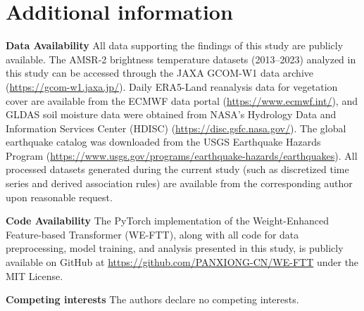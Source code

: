 \documentclass[fleqn,10pt]{wlscirep_mdpi_style}
\begin{document}
\section*{Additional information}
\textbf{Data Availability} 
All data supporting the findings of this study are publicly available. The AMSR-2 brightness temperature datasets (2013–2023) analyzed in this study can be accessed through the JAXA GCOM-W1 data archive (\url{https://gcom-w1.jaxa.jp/}). Daily ERA5-Land reanalysis data for vegetation cover are available from the ECMWF data portal (\url{https://www.ecmwf.int/}), and GLDAS soil moisture data were obtained from NASA's Hydrology Data and Information Services Center (HDISC) (\url{https://disc.gsfc.nasa.gov/}). The global earthquake catalog was downloaded from the USGS Earthquake Hazards Program (\url{https://www.usgs.gov/programs/earthquake-hazards/earthquakes}). All processed datasets generated during the current study (such as discretized time series and derived association rules) are available from the corresponding author upon reasonable request.

\textbf{Code Availability} 
The PyTorch implementation of the Weight-Enhanced Feature-based Transformer (WE-FTT), along with all code for data preprocessing, model training, and analysis presented in this study, is publicly available on GitHub at \url{https://github.com/PANXIONG-CN/WE-FTT} under the MIT License.

\textbf{Competing interests} The authors declare no competing interests.

%  
\end{document}
